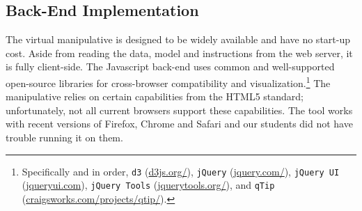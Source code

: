 \documentclass[11pt,letterpaper]{article}
\newcommand{\Note}[1]{}
\renewcommand{\Note}[1]{\hl{[#1]}}  %
\newcommand{\NoteSigned}[3]{{\sethlcolor{#2}\Note{#1: #3}}}
\newcommand{\NoteFF}[1]{\NoteSigned{FF}{LightBlue}{#1}}
\newcommand{\NoteJE}[1]{\NoteSigned{JE}{LightGreen}{#1}}
\begin{document}
\subsection{Back-End Implementation}\label{sec:backend}
The virtual manipulative is designed to be widely available and have no start-up cost. 
Aside from reading the data, model and instructions from the web server, it is fully 
client-side. The Javascript back-end uses common and well-supported open-source 
libraries for cross-browser compatibility and visualization.\footnote{Specifically and in order, 
\texttt{d3} (\url{d3js.org/}),
\texttt{jQuery} (\url{jquery.com/}), 
\texttt{jQuery UI} (\url{jqueryui.com}),
\texttt{jQuery Tools} (\url{jquerytools.org/}), and
\texttt{qTip} (\url{craigsworks.com/projects/qtip/}).}
The manipulative relies on certain capabilities from the HTML5
standard; unfortunately, not all current browsers support these
capabilities.
The tool works with recent versions of Firefox, Chrome and Safari and 
our students did not have trouble running it on them.
%


%
%
%

\end{document}
